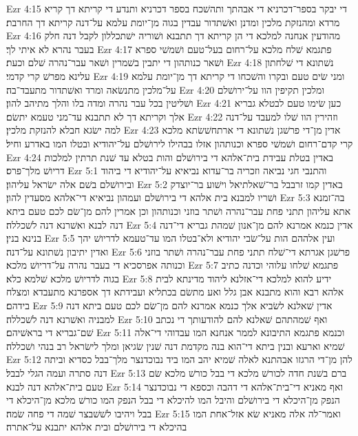 Ezr 4:15  די יבקר בספר־דכרניא די אבהתך ותהשׁכח בספר דכרניא ותנדע די קריתא דך קריא מרדא ומהנזקת מלכין ומדנן ואשׁתדור עבדין בגוה מן־יומת עלמא על־דנה קריתא דך החרבת׃
Ezr 4:16  מהודעין אנחנה למלכא די הן קריתא דך תתבנא ושׁוריה ישׁתכללון לקבל דנה חלק בעבר נהרא לא איתי לך׃
Ezr 4:17  פתגמא שׁלח מלכא על־רחום בעל־טעם ושׁמשׁי ספרא ושׁאר כנותהון די יתבין בשׁמרין ושׁאר עבר־נהרה שׁלם וכעת׃
Ezr 4:18  נשׁתונא די שׁלחתון עלינא מפרשׁ קרי קדמי׃
Ezr 4:19  ומני שׂים טעם ובקרו והשׁכחו די קריתא דך מן־יומת עלמא על־מלכין מתנשׂאה ומרד ואשׁתדור מתעבד־בה׃
Ezr 4:20  ומלכין תקיפין הוו על־ירושׁלם ושׁליטין בכל עבר נהרה ומדה בלו והלך מתיהב להון׃
Ezr 4:21  כען שׂימו טעם לבטלא גבריא אלך וקריתא דך לא תתבנא עד־מני טעמא יתשׂם׃
Ezr 4:22  וזהירין הוו שׁלו למעבד על־דנה למה ישׂגא חבלא להנזקת מלכין׃
Ezr 4:23  אדין מן־די פרשׁגן נשׁתונא די ארתחשׁשׂתא מלכא קרי קדם־רחום ושׁמשׁי ספרא וכנותהון אזלו בבהילו לירושׁלם על־יהודיא ובטלו המו באדרע וחיל׃
Ezr 4:24  באדין בטלת עבידת בית־אלהא די בירושׁלם והות בטלא עד שׁנת תרתין למלכות דריושׁ מלך־פרס׃
Ezr 5:1  והתנבי חגי נביאה וזכריה בר־עדוא נביאיא על־יהודיא די ביהוד ובירושׁלם בשׁם אלה ישׂראל עליהון׃
Ezr 5:2  באדין קמו זרבבל בר־שׁאלתיאל וישׁוע בר־יוצדק ושׁריו למבנא בית אלהא די בירושׁלם ועמהון נביאיא די־אלהא מסעדין להון׃
Ezr 5:3  בה־זמנא אתא עליהון תתני פחת עבר־נהרה ושׁתר בוזני וכנותהון וכן אמרין להם מן־שׂם לכם טעם ביתא דנה לבנא ואשׁרנא דנה לשׁכללה׃
Ezr 5:4  אדין כנמא אמרנא להם מן־אנון שׁמהת גבריא די־דנה בנינא בנין׃
Ezr 5:5  ועין אלההם הות על־שׂבי יהודיא ולא־בטלו המו עד־טעמא לדריושׁ יהך ואדין יתיבון נשׁתונא על־דנה׃
Ezr 5:6  פרשׁגן אגרתא די־שׁלח תתני פחת עבר־נהרה ושׁתר בוזני וכנותה אפרסכיא די בעבר נהרה על־דריושׁ מלכא׃
Ezr 5:7  פתגמא שׁלחו עלוהי וכדנה כתיב בגוה לדריושׁ מלכא שׁלמא כלא׃
Ezr 5:8  ידיע להוא למלכא די־אזלנא ליהוד מדינתא לבית אלהא רבא והוא מתבנא אבן גלל ואע מתשׂם בכתליא ועבידתא דך אספרנא מתעבדא ומצלח בידהם׃
Ezr 5:9  אדין שׁאלנא לשׂביא אלך כנמא אמרנא להם מן־שׂם לכם טעם ביתא דנה למבניה ואשׁרנא דנה לשׁכללה׃
Ezr 5:10  ואף שׁמהתהם שׁאלנא להם להודעותך די נכתב שׁם־גבריא די בראשׁיהם׃
Ezr 5:11  וכנמא פתגמא התיבונא לממר אנחנא המו עבדוהי די־אלה שׁמיא וארעא ובנין ביתא די־הוא בנה מקדמת דנה שׁנין שׂגיאן ומלך לישׂראל רב בנהי ושׁכללה׃
Ezr 5:12  להן מן־די הרגזו אבהתנא לאלה שׁמיא יהב המו ביד נבוכדנצר מלך־בבל כסדיא וביתה דנה סתרה ועמה הגלי לבבל׃
Ezr 5:13  ברם בשׁנת חדה לכורשׁ מלכא די בבל כורשׁ מלכא שׂם טעם בית־אלהא דנה לבנא׃
Ezr 5:14  ואף מאניא די־בית־אלהא די דהבה וכספא די נבוכדנצר הנפק מן־היכלא די בירושׁלם והיבל המו להיכלא די בבל הנפק המו כורשׁ מלכא מן־היכלא די בבל ויהיבו לשׁשׁבצר שׁמה די פחה שׂמה׃
Ezr 5:15  ואמר־לה אלה מאניא שׂא אזל־אחת המו בהיכלא די בירושׁלם ובית אלהא יתבנא על־אתרה׃

